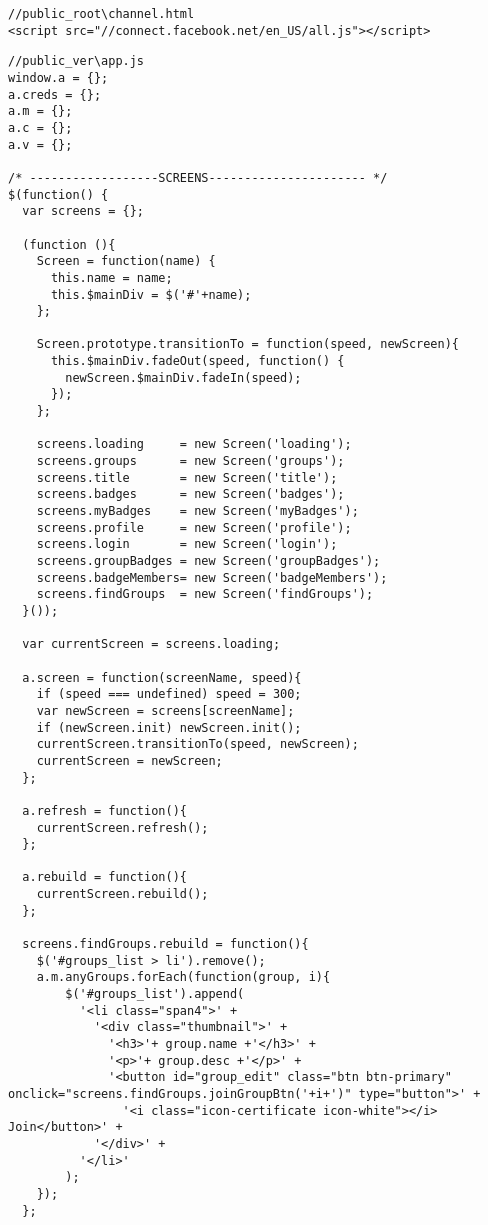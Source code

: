 \small
\lstset{basicstyle=\ttfamily,breaklines=true}
\begin{lstlisting}
//public_root\channel.html
<script src="//connect.facebook.net/en_US/all.js"></script>
\end{lstlisting}

\begin{lstlisting}
//public_ver\app.js
window.a = {};
a.creds = {};
a.m = {};
a.c = {};
a.v = {};

/* ------------------SCREENS---------------------- */
$(function() {
  var screens = {};
    
  (function (){
    Screen = function(name) {
      this.name = name;
      this.$mainDiv = $('#'+name);
    };
    
    Screen.prototype.transitionTo = function(speed, newScreen){
      this.$mainDiv.fadeOut(speed, function() {
        newScreen.$mainDiv.fadeIn(speed);
      });
    };    
    
    screens.loading     = new Screen('loading');
    screens.groups      = new Screen('groups');
    screens.title       = new Screen('title');
    screens.badges      = new Screen('badges');
    screens.myBadges    = new Screen('myBadges');
    screens.profile     = new Screen('profile'); 
    screens.login       = new Screen('login');
    screens.groupBadges = new Screen('groupBadges');
    screens.badgeMembers= new Screen('badgeMembers');
    screens.findGroups  = new Screen('findGroups');
  }());
  
  var currentScreen = screens.loading;
        
  a.screen = function(screenName, speed){
    if (speed === undefined) speed = 300;
    var newScreen = screens[screenName];
    if (newScreen.init) newScreen.init();
    currentScreen.transitionTo(speed, newScreen);
    currentScreen = newScreen;
  };
  
  a.refresh = function(){
    currentScreen.refresh();
  };

  a.rebuild = function(){
    currentScreen.rebuild();
  };
  
  screens.findGroups.rebuild = function(){
    $('#groups_list > li').remove();
    a.m.anyGroups.forEach(function(group, i){
        $('#groups_list').append(
          '<li class="span4">' +
            '<div class="thumbnail">' +
              '<h3>'+ group.name +'</h3>' +
              '<p>'+ group.desc +'</p>' +
              '<button id="group_edit" class="btn btn-primary" onclick="screens.findGroups.joinGroupBtn('+i+')" type="button">' +
                '<i class="icon-certificate icon-white"></i> Join</button>' +
            '</div>' +
          '</li>'
        );  
    });
  };
  

\end{lstlisting}
